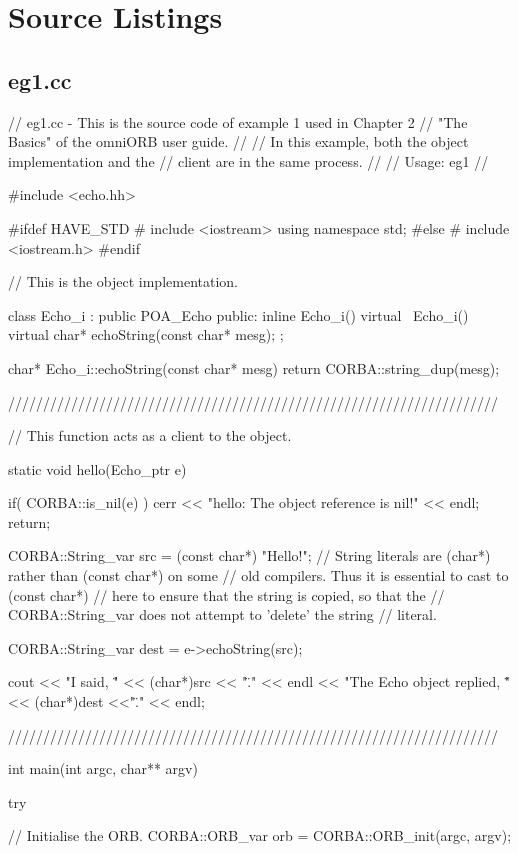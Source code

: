 \documentclass[11pt,twoside,a4paper]{book}
\begin{document}
\clearpage
\section{Source Listings}

\subsection{eg1.cc}

\begin{cxxlisting}
// eg1.cc - This is the source code of example 1 used in Chapter 2
//          "The Basics" of the omniORB user guide.
//
//          In this example, both the object implementation and the
//          client are in the same process.
//
// Usage: eg1
//

#include <echo.hh>

#ifdef HAVE_STD
#  include <iostream>
   using namespace std;
#else
#  include <iostream.h>
#endif

// This is the object implementation.

class Echo_i : public POA_Echo
{
public:
  inline Echo_i() {}
  virtual ~Echo_i() {}
  virtual char* echoString(const char* mesg);
};


char* Echo_i::echoString(const char* mesg)
{
  return CORBA::string_dup(mesg);
}


//////////////////////////////////////////////////////////////////////

// This function acts as a client to the object.

static void hello(Echo_ptr e)
{
  if( CORBA::is_nil(e) ) {
    cerr << "hello: The object reference is nil!\n" << endl;
    return;
  }

  CORBA::String_var src = (const char*) "Hello!";
  // String literals are (char*) rather than (const char*) on some
  // old compilers.  Thus it is essential to cast to (const char*)
  // here to ensure that the string is copied, so that the
  // CORBA::String_var does not attempt to 'delete' the string
  // literal.

  CORBA::String_var dest = e->echoString(src);

  cout << "I said, \"" << (char*)src << "\"." << endl
       << "The Echo object replied, \"" << (char*)dest <<"\"." << endl;
}

//////////////////////////////////////////////////////////////////////

int main(int argc, char** argv)
{


  try {
    // Initialise the ORB.
    CORBA::ORB_var orb = CORBA::ORB_init(argc, argv);

}}
\end{cxxlisting}
\end{document}
